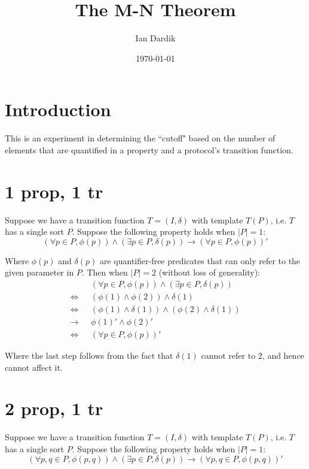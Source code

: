 \documentclass[12pt]{article}
\title{The M-N Theorem}
\author{Ian Dardik}
\date{\today}
\begin{document}
\maketitle

\section{Introduction}
This is an experiment in determining the ``cutoff" based on the number of elements that are quantified in a property and a protocol's transition function.

\section{1 prop, 1 tr}
Suppose we have a transition function $T = (I,\delta)$ with template $T(P)$, i.e. $T$ has a single sort $P$.  Suppose the following property holds when $|P|=1$:
$$(\forall p \in P, \phi(p)) \land (\exists p \in P, \delta(p)) \rightarrow (\forall p \in P, \phi(p))'$$

Where $\phi(p)$ and $\delta(p)$ are quantifier-free predicates that can only refer to the given parameter in $P$.  Then when $|P|=2$ (without loss of generality):
\begin{align*}
  &(\forall p \in P, \phi(p)) \land (\exists p \in P, \delta(p))\\
  \iff &(\phi(1) \land \phi(2)) \land \delta(1)\\
  \iff &(\phi(1) \land \delta(1)) \land (\phi(2) \land \delta(1))\\
  \rightarrow\text{ } &\phi(1)' \land \phi(2)'\\
  \iff &(\forall p \in P, \phi(p))'
\end{align*}

Where the last step follows from the fact that $\delta(1)$ cannot refer to $2$, and hence cannot affect it.

\section{2 prop, 1 tr}
Suppose we have a transition function $T = (I,\delta)$ with template $T(P)$, i.e. $T$ has a single sort $P$.  Suppose the following property holds when $|P|=1$:
$$(\forall p,q \in P, \phi(p,q)) \land (\exists p \in P, \delta(p)) \rightarrow (\forall p,q \in P, \phi(p,q))'$$
\end{document}

